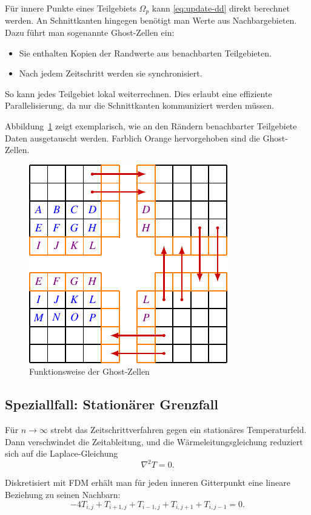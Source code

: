 Für innere Punkte eines Teilgebiets $\Omega_p$ kann \eqref{eq:update-dd} direkt berechnet werden.  
An Schnittkanten hingegen benötigt man Werte aus Nachbargebieten.  
Dazu führt man sogenannte Ghost-Zellen ein:
\begin{itemize}
	\item Sie enthalten Kopien der Randwerte aus benachbarten Teilgebieten.
	\item Nach jedem Zeitschritt werden sie synchronisiert.
\end{itemize}
So kann jedes Teilgebiet lokal weiterrechnen. Dies erlaubt eine effiziente Parallelisierung, da nur die Schnittkanten kommuniziert werden müssen.

Abbildung~\ref{parallelisierung:fig:ghostCells} zeigt exemplarisch, wie an den Rändern benachbarter Teilgebiete Daten ausgetauscht werden. Farblich Orange hervorgehoben sind die Ghost-Zellen.

\begin{figure}[htbp]
	\centering
	\includegraphics{papers/parallelisierung/images/ghostCells.pdf}
	\caption{Funktionsweise der Ghost-Zellen}
	\label{parallelisierung:fig:ghostCells}
\end{figure}



\subsection{Speziallfall: Stationärer Grenzfall}
Für $n \to \infty$ strebt das Zeitschrittverfahren gegen ein stationäres Temperaturfeld. 
Dann verschwindet die Zeitableitung, und die Wärmeleitungsgleichung reduziert sich auf die Laplace-Gleichung
\[
\nabla^2 T = 0.
\]

Diskretisiert mit FDM erhält man für jeden inneren Gitterpunkt eine lineare Beziehung zu seinen Nachbarn:
\[
-4T_{i,j} + T_{i+1,j} + T_{i-1,j} + T_{i,j+1} + T_{i,j-1} = 0.
\]

